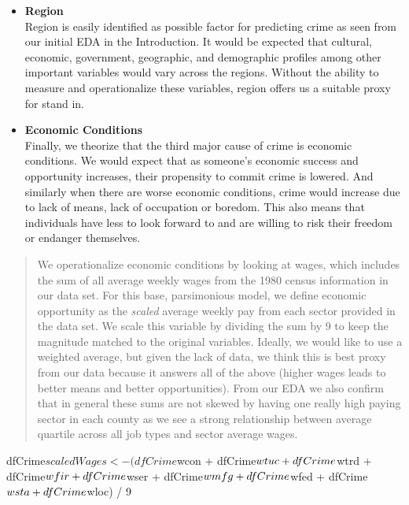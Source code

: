 \documentclass[]{article}
\newenvironment{Shaded}{}{}
\newcommand{\DecValTok}[1]{#1}
\newcommand{\NormalTok}[1]{#1}
\newcommand{\OperatorTok}[1]{#1}
\newcommand{\StringTok}[1]{\textcolor[rgb]{0.00,0.50,0.50}{#1}}
\begin{document}
\begin{itemize}
\item
  \textbf{Region}\\
  Region is easily identified as possible factor for predicting crime as
  seen from our initial EDA in the Introduction. It would be expected
  that cultural, economic, government, geographic, and demographic
  profiles among other important variables would vary across the
  regions. Without the ability to measure and operationalize these
  variables, region offers us a suitable proxy for stand in.
\item
  \textbf{Economic Conditions}\\
  Finally, we theorize that the third major cause of crime is economic
  conditions. We would expect that as someone's economic success and
  opportunity increases, their propensity to commit crime is lowered.
  And similarly when there are worse economic conditions, crime would
  increase due to lack of means, lack of occupation or boredom. This
  also means that individuals have less to look forward to and are
  willing to risk their freedom or endanger themselves.
\end{itemize}

\begin{quote}
We operationalize economic conditions by looking at wages, which
includes the sum of all average weekly wages from the 1980 census
information in our data set. For this base, parsimonious model, we
define economic opportunity as the \emph{scaled} average weekly pay from
each sector provided in the data set. We scale this variable by dividing
the sum by 9 to keep the magnitude matched to the original variables.
Ideally, we would like to use a weighted average, but given the lack of
data, we think this is best proxy from our data because it answers all
of the above (higher wages leads to better means and better
opportunities). From our EDA we also confirm that in general these sums
are not skewed by having one really high paying sector in each county as
we see a strong relationship between average quartile across all job
types and sector average wages.
\end{quote}

\begin{Shaded}
\begin{Highlighting}[]
\NormalTok{dfCrime}\OperatorTok{$}\NormalTok{scaledWages<-(dfCrime}\OperatorTok{$}\NormalTok{wcon }\OperatorTok{+}\StringTok{ }\NormalTok{dfCrime}\OperatorTok{$}\NormalTok{wtuc }\OperatorTok{+}\StringTok{ }\NormalTok{dfCrime}\OperatorTok{$}\NormalTok{wtrd }\OperatorTok{+}\StringTok{ }\NormalTok{dfCrime}\OperatorTok{$}\NormalTok{wfir }\OperatorTok{+}
\StringTok{    }\NormalTok{dfCrime}\OperatorTok{$}\NormalTok{wser }\OperatorTok{+}\StringTok{ }\NormalTok{dfCrime}\OperatorTok{$}\NormalTok{wmfg }\OperatorTok{+}\StringTok{ }\NormalTok{dfCrime}\OperatorTok{$}\NormalTok{wfed }\OperatorTok{+}\StringTok{ }\NormalTok{dfCrime}\OperatorTok{$}\NormalTok{wsta }\OperatorTok{+}\StringTok{ }\NormalTok{dfCrime}\OperatorTok{$}\NormalTok{wloc) }\OperatorTok{/}\StringTok{ }\DecValTok{9}
\end{Highlighting}
\end{Shaded}
\end{document}
